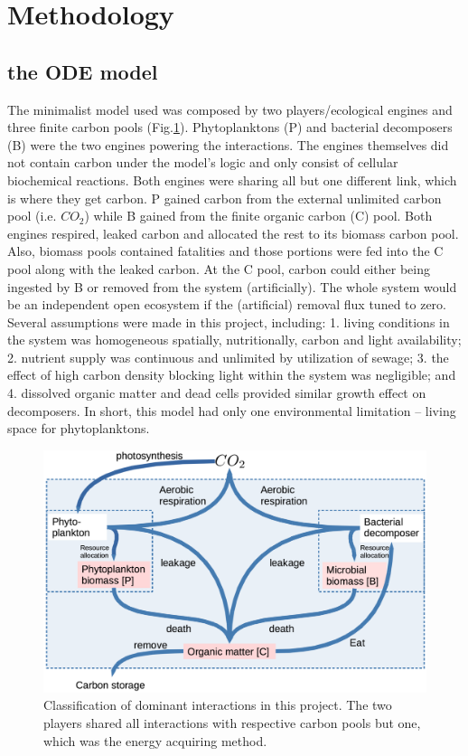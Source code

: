\documentclass[../thesis.tex]{subfiles} %
\begin{document}
\section{Methodology}

\subsection{the ODE model}
The minimalist model used was composed by two players/ecological engines and three finite carbon pools (Fig.\ref{modelInWord}).  Phytoplanktons (P) and bacterial decomposers (B) were the two engines powering the interactions.  The engines themselves did not contain carbon under the model's logic and only consist of cellular biochemical reactions.  Both engines were sharing all but one different link, which is where they get carbon.  P gained carbon from the external unlimited carbon pool (i.e. $CO_2$) while B gained from the finite organic carbon (C) pool.  Both engines respired, leaked carbon and allocated the rest to its biomass carbon pool.  Also, biomass pools contained fatalities and those portions were fed into the C pool along with the leaked carbon.  At the C pool, carbon could either being ingested by B or removed from the system (artificially).  The whole system would be an independent open ecosystem if the (artificial) removal flux tuned to zero.  Several assumptions were made in this project, including: 1. living conditions in the system was homogeneous spatially, nutritionally, carbon and light availability; 2. nutrient supply was continuous and unlimited by utilization of sewage;\autocite{markou2014microalgal} 3. the effect of high carbon density blocking light within the system was negligible; and 4. dissolved organic matter and dead cells provided similar growth effect on decomposers.  In short, this model had only one environmental limitation -- living space for phytoplanktons.

\begin{figure}[H]
    \centering
    \includegraphics[width=.8\linewidth]{code/thesisSec/model.png}
    \caption[Model visualization]{Classification of dominant interactions in this project.  The two players shared all interactions with respective carbon pools but one, which was the energy acquiring method.}
    \label{modelInWord}
\end{figure}
\end{document}
